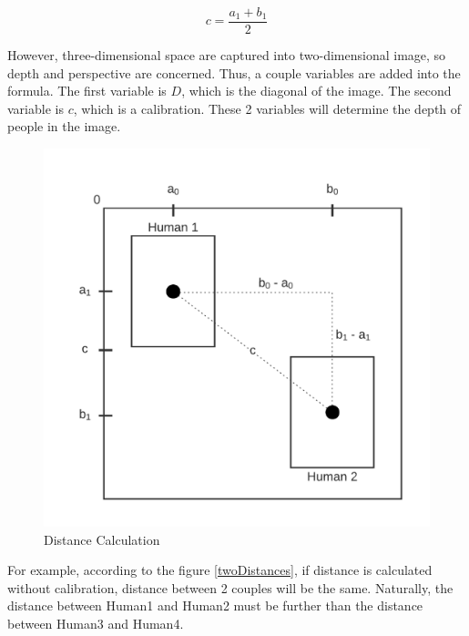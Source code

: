         \begin{equation*}
            c = \frac{a_{1}+b_{1}}{2}
        \end{equation*}

        However, three-dimensional space are captured into two-dimensional image, so depth and perspective are concerned.
        Thus, a couple variables are added into the formula.
        The first variable is $D$, which is the diagonal of the image.
        The second variable is $c$, which is a calibration.
        These 2 variables will determine the depth of people in the image.

        \begin{figure}[!ht]
            \includegraphics[width=6in]{images/chapter2/distance.png}
            \caption{Distance Calculation}
            \label{distanceCalculation}
        \end{figure}

        For example, according to the figure \ref{twoDistances},
        if distance is calculated without calibration, distance between 2 couples will be the same.
        Naturally, the distance between Human1 and Human2 must be further than the distance between Human3 and Human4.

